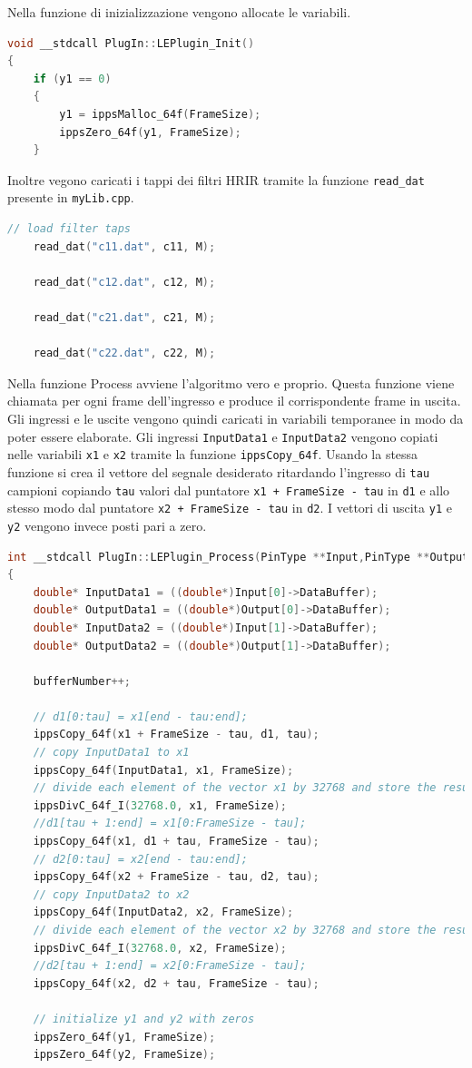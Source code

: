 \documentclass[12pt,a4paper,titlepage]{article}
\begin{document}
Nella funzione di inizializzazione vengono allocate le variabili.
\begin{lstlisting}[language=cpp, label=code:alloc, caption = Esempio allocazione delle variabili in \texttt{LEPlugin\_Init}, breaklines = false, captionpos = b]
void __stdcall PlugIn::LEPlugin_Init()
{
	if (y1 == 0)
	{
		y1 = ippsMalloc_64f(FrameSize);
		ippsZero_64f(y1, FrameSize);
	}
\end{lstlisting}
Inoltre vegono caricati i tappi dei filtri HRIR tramite la funzione \texttt{read\_dat} presente in \texttt{myLib.cpp}.
\begin{lstlisting}[language=cpp, label=code:hrir, caption = Lettura delle HRIR, breaklines = false, captionpos = b]
	// load filter taps
	read_dat("c11.dat", c11, M);

	read_dat("c12.dat", c12, M);

	read_dat("c21.dat", c21, M);

	read_dat("c22.dat", c22, M);
\end{lstlisting}
Nella funzione Process avviene l'algoritmo vero e proprio. Questa funzione viene chiamata per ogni frame dell'ingresso e produce il corrispondente frame in uscita.
Gli ingressi e le uscite vengono quindi caricati in variabili temporanee in modo da poter essere elaborate.
Gli ingressi \texttt{InputData1} e \texttt{InputData2} vengono copiati nelle variabili \texttt{x1} e \texttt{x2} tramite la funzione \texttt{ippsCopy\_64f}.
Usando la stessa funzione si crea il vettore del segnale desiderato ritardando l’ingresso di \texttt{tau} campioni copiando \texttt{tau} valori dal puntatore \texttt{x1 + FrameSize - tau} in \texttt{d1} e  allo stesso modo dal puntatore \texttt{x2 + FrameSize - tau} in \texttt{d2}.
I vettori di uscita \texttt{y1} e \texttt{y2} vengono invece posti pari a zero.
\begin{lstlisting}[language=cpp, label=code:proc, caption = Process, breaklines = false, captionpos = b]
int __stdcall PlugIn::LEPlugin_Process(PinType **Input,PinType **Output,LPVOID ExtraInfo)
{ 
	double* InputData1 = ((double*)Input[0]->DataBuffer);
	double* OutputData1 = ((double*)Output[0]->DataBuffer);
	double* InputData2 = ((double*)Input[1]->DataBuffer);
	double* OutputData2 = ((double*)Output[1]->DataBuffer);
	
	bufferNumber++;

	// d1[0:tau] = x1[end - tau:end];
	ippsCopy_64f(x1 + FrameSize - tau, d1, tau);
	// copy InputData1 to x1
	ippsCopy_64f(InputData1, x1, FrameSize);
	// divide each element of the vector x1 by 32768 and store the result in x1
	ippsDivC_64f_I(32768.0, x1, FrameSize);
	//d1[tau + 1:end] = x1[0:FrameSize - tau];	
	ippsCopy_64f(x1, d1 + tau, FrameSize - tau);
	// d2[0:tau] = x2[end - tau:end];
	ippsCopy_64f(x2 + FrameSize - tau, d2, tau);
	// copy InputData2 to x2
	ippsCopy_64f(InputData2, x2, FrameSize);
	// divide each element of the vector x2 by 32768 and store the result in x2
	ippsDivC_64f_I(32768.0, x2, FrameSize);
	//d2[tau + 1:end] = x2[0:FrameSize - tau];	
	ippsCopy_64f(x2, d2 + tau, FrameSize - tau);
	
	// initialize y1 and y2 with zeros
	ippsZero_64f(y1, FrameSize);
	ippsZero_64f(y2, FrameSize);
\end{lstlisting}
\end{document}
